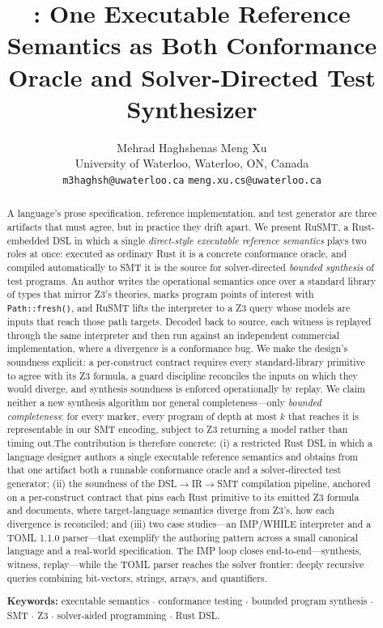 \documentclass[11pt,a4paper]{article}
\title{\bfseries \rusmt{}: One Executable Reference Semantics as Both
Conformance Oracle and Solver-Directed Test Synthesizer}
\author{Mehrad Haghshenas \quad Meng Xu \\[3pt]
        \normalsize University of Waterloo, Waterloo, ON, Canada \\[1pt]
        \small \texttt{m3haghsh@uwaterloo.ca} \quad \texttt{meng.xu.cs@uwaterloo.ca}}
\date{}
\theoremstyle{definition}
\theoremstyle{remark}
\newcommand{\rusmt}{RuSMT}
\newcommand{\imp}{IMP}
\newcommand{\toml}{TOML}
\newcommand{\code}[1]{\texttt{#1}}
\begin{document}
\maketitle

\begin{abstract}
A language's prose specification, reference implementation, and test generator                                                                                  
are three artifacts that must agree, but in practice they drift apart. We present
\rusmt{}, a Rust-embedded DSL in which a single \emph{direct-style executable
reference semantics} plays two roles at once: executed as ordinary Rust it is a
concrete conformance oracle, and compiled automatically to SMT it is the source
for solver-directed \emph{bounded synthesis} of test programs. An author writes
the operational semantics once over a standard library of types that mirror Z3's theories,
marks program points of interest with \code{Path::fresh()}, and \rusmt{} lifts
the interpreter to a Z3 query whose models are inputs that reach those path targets.
Decoded back to source, each witness is replayed through the same interpreter and
then run against an independent commercial implementation, where a divergence is a
conformance bug. We make the design's soundness explicit: a per-construct
contract requires every standard-library primitive to agree with its Z3 formula,
a guard discipline reconciles the inputs on which they would diverge, and
synthesis soundness is enforced operationally by replay. We claim neither a new synthesis algorithm nor general completeness---only
\emph{bounded completeness}: for every marker, every program of depth at most
$k$ that reaches it is representable in our SMT encoding, subject to Z3
returning a model rather than timing out.The contribution is therefore concrete: (i) a restricted Rust DSL in which a
language designer authors a single executable reference semantics and obtains
from that one artifact both a runnable conformance oracle and a
solver-directed test generator; (ii) the soundness of the
DSL$\to$IR$\to$SMT compilation pipeline, anchored on a per-construct contract
that pins each Rust primitive to its emitted Z3 formula and documents, where
target-language semantics diverge from Z3's, how each divergence is
reconciled; and (iii) two case studies---an IMP/WHILE interpreter and a TOML
1.1.0 parser---that exemplify the authoring pattern across a small canonical
language and a real-world specification. The \imp{} loop closes end-to-end---synthesis, witness, replay---while the
\toml{} parser reaches the solver frontier: deeply recursive queries
combining bit-vectors, strings, arrays, and quantifiers.

\medskip
\noindent\textbf{Keywords:} executable semantics $\cdot$ conformance testing
$\cdot$ bounded program synthesis $\cdot$ SMT $\cdot$ Z3 $\cdot$ solver-aided programming $\cdot$ Rust DSL.
\end{abstract}
\end{document}
